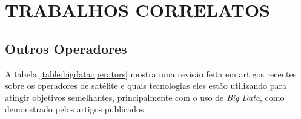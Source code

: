 
\chapter{TRABALHOS CORRELATOS}

\section{Outros Operadores}

A tabela \ref{table:bigdataoperators} mostra uma revisão feita em artigos recentes sobre os operadores de satélite e quais tecnologias eles estão utilizando para atingir objetivos semelhantes, principalmente com o uso de \textit{Big Data}, como demonstrado pelos artigos publicados.

